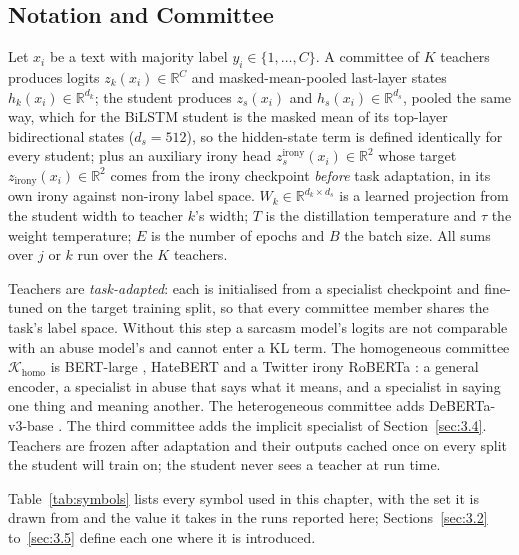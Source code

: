 \subsection{Notation and Committee}
\label{sec:3.1}
Let $x_i$ be a text with majority label $y_i \in \{1,\dots,C\}$. A committee of $K$ teachers
produces logits $z_k(x_i) \in \mathbb{R}^C$ and masked-mean-pooled last-layer states $h_k(x_i) \in
\mathbb{R}^{d_k}$; the student produces $z_s(x_i)$ and $h_s(x_i) \in \mathbb{R}^{d_s}$, pooled the
same way, which for the BiLSTM student is the masked mean of its top-layer bidirectional states
($d_s = 512$), so the hidden-state term is defined identically for every student; plus an auxiliary
irony head $z_s^{\text{irony}}(x_i) \in \mathbb{R}^2$ whose target $z_{\text{irony}}(x_i) \in
\mathbb{R}^2$ comes from the irony checkpoint \emph{before} task adaptation, in its own irony
against non-irony label space. $W_k \in \mathbb{R}^{d_k \times d_s}$ is a learned projection from
the student width to teacher $k$'s width; $T$ is the distillation temperature and $\tau$ the weight
temperature; $E$ is the number of epochs and $B$ the batch size. All sums over $j$ or $k$ run over
the $K$ teachers.

Teachers are \emph{task-adapted}: each is initialised from a specialist checkpoint and fine-tuned on
the target training split, so that every committee member shares the task's label space. Without
this step a sarcasm model's logits are not comparable with an abuse model's and cannot enter a KL
term. The homogeneous committee $\mathcal{K}_{\text{homo}}$ is BERT-large \cite{devlin2019bert},
HateBERT \cite{caselli2021hatebert} and a Twitter irony RoBERTa \cite{barbieri2020tweeteval,
liu2019roberta}: a general encoder, a specialist in abuse that says what it means, and a specialist
in saying one thing and meaning another. The heterogeneous committee adds DeBERTa-v3-base
\cite{he2023debertav3}. The third committee adds the implicit specialist of Section~\ref{sec:3.4}.
Teachers are frozen after adaptation and their outputs cached once on every split the student will
train on; the student never sees a teacher at run time.

Table~\ref{tab:symbols} lists every symbol used in this chapter, with the set it is drawn from and
the value it takes in the runs reported here; Sections~\ref{sec:3.2} to~\ref{sec:3.5} define each one
where it is introduced.

